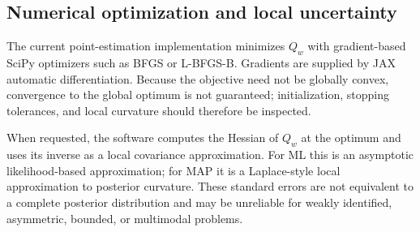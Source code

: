 \subsection{Numerical optimization and local uncertainty}

The current point-estimation implementation minimizes $Q_w$ with gradient-based
SciPy optimizers such as BFGS or L-BFGS-B. Gradients are supplied by JAX automatic
differentiation. Because the objective need not be globally convex, convergence
to the global optimum is not guaranteed; initialization, stopping tolerances, and
local curvature should therefore be inspected.

When requested, the software computes the Hessian of $Q_w$ at the optimum and
uses its inverse as a local covariance approximation. For ML this is an asymptotic
likelihood-based approximation; for MAP it is a Laplace-style local approximation
to posterior curvature. These standard errors are not equivalent to a complete
posterior distribution and may be unreliable for weakly identified, asymmetric,
bounded, or multimodal problems.


